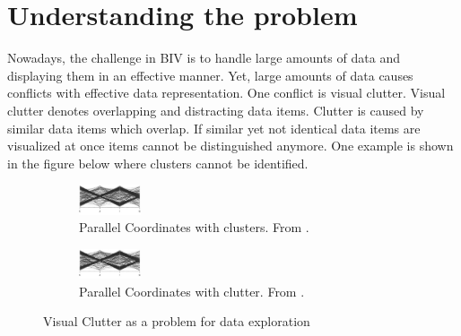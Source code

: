 \section{Understanding the problem}\label{problems}
 Nowadays, the challenge in BIV is to handle large amounts of data and displaying them in an effective manner. Yet, large amounts of data causes conflicts with effective data representation. One conflict is visual clutter. Visual clutter denotes overlapping and distracting data items. Clutter is caused by similar data items which overlap. If similar yet not identical data items are visualized at once items cannot be distinguished anymore. One example is shown in the figure below where clusters cannot be identified. 
 
 \begin{figure}[H]
 \centering
 \begin{subfigure}[b]{0.25\textwidth}
     \includegraphics[width=0.20\textwidth]{src/images/PC1}
     \caption{Parallel Coordinates with clusters. From \cite{Tatu2010}.}
 \end{subfigure}
 \hfill
 \begin{subfigure}[b]{0.25\textwidth}
     \includegraphics[width=0.20\textwidth]{src/images/PC1}
     \caption{Parallel Coordinates with clutter. From \cite{Tatu2010}.}
 \end{subfigure}
 \caption{Visual Clutter as a problem for data exploration}
 \label{fig:visual clutter}
 \end{figure}
 

